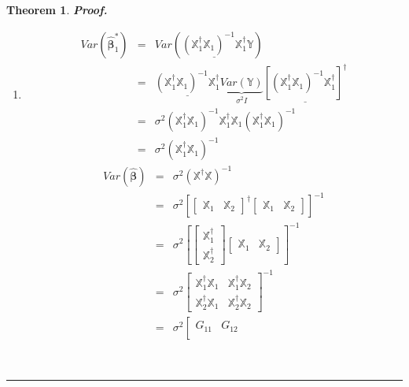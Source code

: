 \documentclass{article}
\newtheorem{theorem}{Theorem}
\newenvironment{proof}[1][Proof]{\noindent\textbf{#1.} }{\ \rule{0.5em}{0.5em}}
\begin{document}
\begin{theorem}
\begin{proof}
\begin{enumerate}
\item 
\begin{eqnarray*}
Var\left( \boldsymbol{\hat{\beta}}_{1}^{\ast }\right)  &=&Var\left( 
\underline{\left( \mathbb{X}_{1}^{\dagger }\mathbb{X}_{1}\right) ^{-1}%
\mathbb{X}_{1}^{\dagger }}\mathbb{Y}\right)  \\
&=&\underline{\left( \mathbb{X}_{1}^{\dagger }\mathbb{X}_{1}\right) ^{-1}%
\mathbb{X}_{1}^{\dagger }}\underset{\sigma ^{2}I}{\underbrace{Var\left( 
\mathbb{Y}\right) }}\underline{\left[ \left( \mathbb{X}_{1}^{\dagger }%
\mathbb{X}_{1}\right) ^{-1}\mathbb{X}_{1}^{\dagger }\right] ^{\dagger }} \\
&=&\sigma ^{2}\left( \mathbb{X}_{1}^{\dagger }\mathbb{X}_{1}\right) ^{-1}%
\mathbb{X}_{1}^{\dagger }\mathbb{X}_{1}\left( \mathbb{X}_{1}^{\dagger }%
\mathbb{X}_{1}\right) ^{-1} \\
&=&\sigma ^{2}\left( \mathbb{X}_{1}^{\dagger }\mathbb{X}_{1}\right) ^{-1}
\end{eqnarray*}%
\begin{eqnarray*}
Var\left( \boldsymbol{\hat{\beta}}\right)  &=&\sigma ^{2}\left( \mathbb{X}%
^{\dagger }\mathbb{X}\right) ^{-1} \\
&=&\sigma ^{2}\left[ \left[ 
\begin{array}{cc}
\mathbb{X}_{1} & \mathbb{X}_{2}%
\end{array}%
\right] ^{\dagger }\left[ 
\begin{array}{cc}
\mathbb{X}_{1} & \mathbb{X}_{2}%
\end{array}%
\right] \right] ^{-1} \\
&=&\sigma ^{2}\left[ \left[ 
\begin{array}{c}
\mathbb{X}_{1}^{\dagger } \\ 
\mathbb{X}_{2}^{\dagger }%
\end{array}%
\right] \left[ 
\begin{array}{cc}
\mathbb{X}_{1} & \mathbb{X}_{2}%
\end{array}%
\right] \right] ^{-1} \\
&=&\sigma ^{2}\left[ 
\begin{array}{cc}
\mathbb{X}_{1}^{\dagger }\mathbb{X}_{1} & \mathbb{X}_{1}^{\dagger }\mathbb{X}%
_{2} \\ 
\mathbb{X}_{2}^{\dagger }\mathbb{X}_{1} & \mathbb{X}_{2}^{\dagger }\mathbb{X}%
_{2}%
\end{array}%
\right] ^{-1} \\
&=&\sigma ^{2}\left[ 
\begin{array}{cc}
G_{11} & G_{12} \\ 

\end{array}
\end{eqnarray*}
\end{enumerate}
\end{proof}
\end{theorem}
\end{document}
